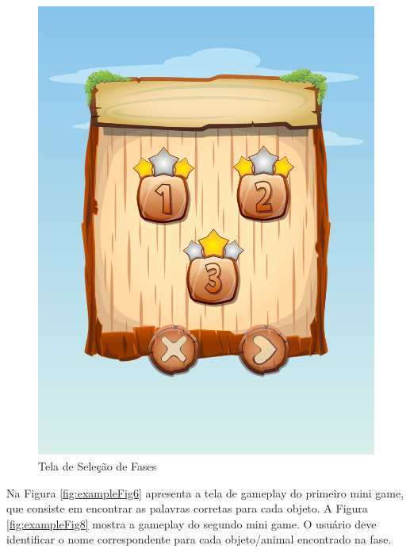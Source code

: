 \documentclass[12pt]{article}
\begin{document}
\begin{figure}[!htb]
		\includegraphics[width=\linewidth]{img/selectFases.png}
		\caption{Tela de Seleção de Fases}\label{fig:fases}
		\endminipage
	\end{figure}
		
		Na Figura \ref{fig:exampleFig6} apresenta a tela de gameplay do primeiro mini game, que consiste em encontrar as palavras corretas para cada objeto. A Figura \ref{fig:exampleFig8} mostra a gameplay do segundo mini game. O usuário deve identificar o nome correspondente para cada objeto/animal encontrado na fase.
	
\end{document}
